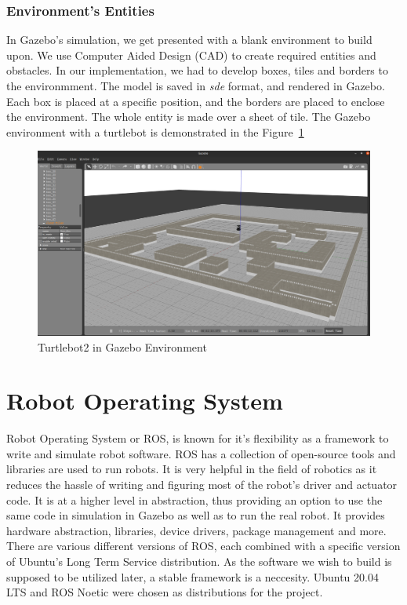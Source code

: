 \subsubsection{Environment's Entities}
In Gazebo's simulation, we get presented with a blank environment to build upon. We use Computer Aided Design (CAD) to create required entities and obstacles. In our implementation,
we had to develop boxes, tiles and borders to the environmment. The model is saved in \textit{sde} format, and rendered in Gazebo. Each box is placed at a specific position, and the borders are placed
to enclose the environment. The whole entity is made over a sheet of tile. The Gazebo environment with a turtlebot is demonstrated in the Figure~\ref{fig:GazeboTurtlebot2} 
\begin{figure}[th]
    \centering
    \includegraphics[width=\textwidth]{Figures/gazebo-image.png}
    \decoRule
    \caption[]{Turtlebot2 in Gazebo Environment}
    \label{fig:GazeboTurtlebot2}
\end{figure}

\section{Robot Operating System}
Robot Operating System or ROS, is known for it's flexibility as a framework to write and simulate robot software. ROS has a collection of open-source tools and libraries are used to run robots. It is
very helpful in the field of robotics as it reduces the hassle of writing and figuring most of the robot's driver and actuator code. It is at a higher level in abstraction, thus providing an option to use the same
code in simulation in Gazebo as well as to run the real robot. It provides hardware abstraction, libraries, device drivers, package management and more. 
There are various different versions of ROS, each combined with a specific version of Ubuntu's Long Term Service distribution. As the software we wish to build is supposed to be utilized later, a stable framework is a neccesity. Ubuntu 20.04 LTS and 
ROS Noetic were chosen as distributions for the project.

